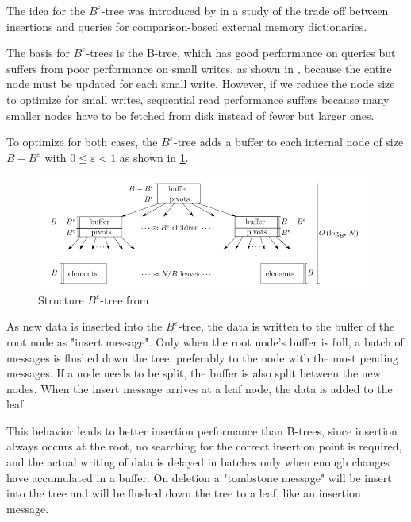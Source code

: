 \documentclass[
	12pt,
	a4paper,
	abstract,
	bibliography=totoc,
	chapterprefix,
	headings=openright,
	numbers=endperiod,
	parskip=half,
	twoside,
]{scrreprt}
\begin{document}
The idea for the $B^{\varepsilon}$-tree was introduced by \cite{brodal2003lower} in a study of the trade off between insertions and queries for comparison-based external memory dictionaries.

The basis for $B^{\varepsilon}$-trees is the B-tree, which has good performance on queries but suffers from poor performance on small writes, as shown in \cite{bender2015introduction}, 
because the entire node must be updated for each small write.
However, if we reduce the node size to optimize for small writes, sequential read performance suffers because many smaller nodes have to be fetched from disk instead of fewer but larger ones.

To optimize for both cases, the $B^{\varepsilon}$-tree adds a buffer to each internal node of size $B - B^{\varepsilon} $ with $ 0 \leq \varepsilon < 1$ as shown in \cref{fig:structure B-epsilon-tree}.

\begin{figure}[ht]
	\centering
	\includegraphics[scale=0.6]{B-epsilon_structure.png}
	\caption{Structure $B^{\varepsilon}$-tree from \cite{bender2015introduction}}
		\label{fig:structure B-epsilon-tree}
\end{figure}

As new data is inserted into the $B^{\varepsilon}$-tree, the data is written to the buffer of the root node as "insert message".
Only when the root node's buffer is full, a batch of messages is flushed down the tree, preferably to the node with the most pending messages. 
If a node needs to be split, the buffer is also split between the new nodes.
When the insert message arrives at a leaf node, the data is added to the leaf.

This behavior leads to better insertion performance than B-trees, since insertion always occurs at the root, no searching for the correct insertion point is required, and  
the actual writing of data is delayed in batches only when enough changes have accumulated in a buffer.
On deletion a "tombstone message" will be insert into the tree and will be flushed down the tree to a leaf, like an insertion message.
\end{document}
